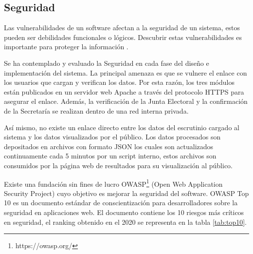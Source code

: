 \subsection{Seguridad}
Las vulnerabilidades de un software afectan a la seguridad de un sistema, estos pueden ser debilidades funcionales o lógicos.
Descubrir estas vulnerabilidades es importante para proteger la información \cite{definicionVulnerabilidad}.

Se ha contemplado y evaluado la Seguridad en cada fase  del diseño e implementación del sistema.  La principal amenaza es que se vulnere el enlace con los usuarios que cargan y verifican los datos.  Por esta razón, los tres módulos están publicados en un servidor web Apache a través del protocolo HTTPS para asegurar el enlace. Además, la verificación de la Junta Electoral y la confirmación de la Secretaría se realizan dentro de una red interna privada. 

Así mismo, no existe un enlace directo entre los datos del escrutinio cargado al sistema y los datos visualizados por el
público. Los datos procesados son depositados en archivos con formato JSON los cuales son actualizados continuamente cada 5 minutos por un script interno, estos archivos son consumidos por la página web de resultados para su visualización al público. 

Existe una fundación sin fines de lucro OWASP\footnote{https://owasp.org/} (Open Web Application Security Project) cuyo objetivo es mejorar la seguridad del software. OWASP Top 10 es un documento estándar de conscientización para desarrolladores sobre la seguridad en aplicaciones web. El documento contiene los 10 riesgos más críticos en seguridad, el ranking obtenido en el 2020 se representa en la tabla \ref{tab:top10}.

